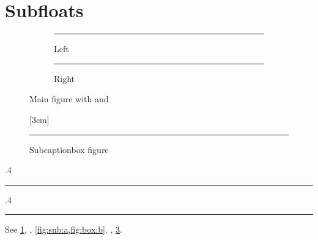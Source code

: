 \documentclass{article}
\begin{document}
\listoffigures
\listoftables
\section{Subfloats}
\begin{figure}[htbp]
\centering
\begin{subfigure}{.4\linewidth}
\centering\rule{2cm}{1cm}
\caption{Left}\label{fig:sub:a}
\end{subfigure}\hfill
\begin{subfigure}{.4\linewidth}
\centering\rule{2cm}{1cm}
\caption{Right}\label{fig:sub:b}
\end{subfigure}
\caption{Main figure with  and }\label{fig:main}
\end{figure}
\begin{figure}[htbp]
\centering
{}\hfill
{}[3cm]{\rule{2cm}{1cm}}
\caption{Subcaptionbox figure}\label{fig:box}
\end{figure}
\begin{table}[htbp]
\caption{Main table}\label{tab:main}
\centering
\begin{subtable}{.4\linewidth}
\caption{Sub table}\label{tab:sub:a}
\centering\rule{2cm}{1cm}
\end{subtable}
\begin{subtable}{.4\linewidth}
\caption*{Starred sub table}
\centering\rule{2cm}{1cm}
\end{subtable}
\end{table}
See \ref{fig:sub:a}, , \cref{fig:sub:a,fig:box:b}, , \cref{fig:main}.
\end{document}
